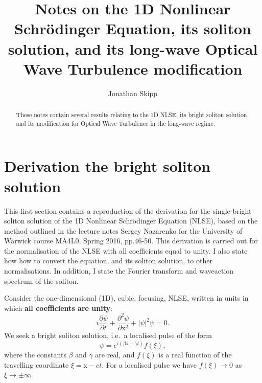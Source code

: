 \documentclass[11pt,a4paper]{article}
\title{Notes on the 1D Nonlinear Schr{\"o}dinger Equation, its soliton solution, and its long-wave Optical Wave Turbulence modification}
\author{Jonathan Skipp}
\date{}
\begin{document}
    \maketitle
\begin{abstract}
These notes contain several results relating to the 1D NLSE, its bright soliton solution, and its modification for Optical Wave Turbulence in the long-wave regime.
 \end{abstract}

\section{Derivation the bright soliton solution}

This first section contains a reproduction of the derivation for the single-bright-soliton solution of the 1D Nonlinear Schr{\"o}dinger Equation (NLSE), based on the method outlined in the lecture notes Sergey Nazarenko for the University of Warwick course MA4L0, Spring 2016, pp.46-50. 
	This derivation is carried out for the normalisation of the NLSE with all coefficients equal to unity. I also state how how to convert the equation, and its soliton solution, to  other normalisations. In addition, I state the Fourier transform and waveaction spectrum of the soliton.

Consider the one-dimensional (1D), cubic, focusing, NLSE, written in units in which \textbf{all coefficients are unity}:
\begin{equation}
	\label{eq:NLS}
	i\frac{\partial\psi}{\partial t} + \frac{\partial^2 \psi}{\partial \mathrm{x}^2} + |\psi|^2 \psi =0.
\end{equation}
We seek a bright soliton solution, i.e.\ a localised pulse of the form 
\begin{equation}
	\label{eq:soli_ansatz}
	\psi = e^{i(\beta \mathrm{x}-\gamma t)} f(\xi),
\end{equation}
where the constants $\beta$ and $\gamma$ are real, and $f(\xi)$ is a real function of the travelling coordinate $\xi = \mathrm{x} - ct$. For a localised pulse we have $f(\xi)\to0$ as $\xi\to\pm\infty$. 
\end{document}
